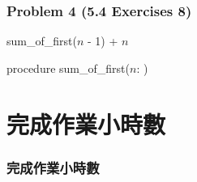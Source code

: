 \documentclass[14pt,hyperref={bookmarks=false}]{beamer}
\begin{document}
	\begin{frame}
	\frametitle{Problem 4 (5.4 Exercises 8)}
	\fontsize{10}{11pt}\selectfont
	
\begin{algorithm}[H]
  \small
\begin{algorithmic}[1]

\ELSE
    \RETURN sum\_of\_first($n$ - 1) + $n$
\ENDIF
\end{algorithmic}
\caption{\small procedure sum\_of\_first($n$: ) }
\label{alg:prime}
\end{algorithm}
	\end{frame}

		
\section{完成作業小時數}

\begin{frame}
\frametitle{完成作業小時數}
\centerline{\fontsize{16}{16pt}}	
\end{frame}

\end{document}
